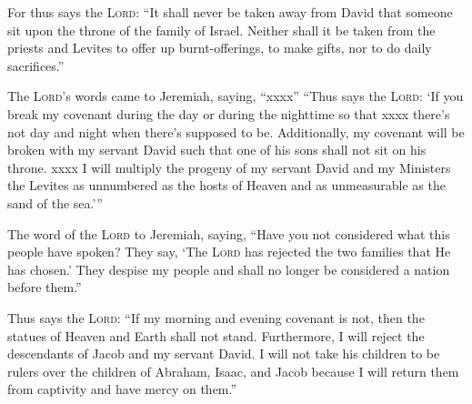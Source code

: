 \begin{inparaenum}
   For thus says the \textsc{Lord}: ``It shall never be taken away from David that someone sit upon the throne of the family of Israel.%
   Neither shall it be taken from the priests and Levites to offer up burnt-offerings, to make gifts, nor to do daily sacrifices.''%
  
   The \textsc{Lord}'s words came to Jeremiah, saying, ``xxxx''%
   ``Thus says the \textsc{Lord}: `If you break my covenant during the day or during the nighttime so that xxxx there's not day and night when there's supposed to be.%
   Additionally, my covenant will be broken with my servant David such that one of his sons shall not sit on his throne. xxxx%
   I will multiply the progeny of my servant David and my Ministers the Levites as unnumbered as the hosts of Heaven and as unmeasurable as the sand of the sea.'\thinspace''%
  
   The word of the \textsc{Lord} to Jeremiah, saying,%
   ``Have you not considered what this people have spoken? They say, `The \textsc{Lord} has rejected the two families that He has chosen.' They despise my people and shall no longer be considered a nation before them.''%
  
   Thus says the \textsc{Lord}: ``If my morning and evening covenant is not, then the statues of Heaven and Earth shall not stand.%
   Furthermore, I will reject the descendants of Jacob and my servant David. I will not take his children to be rulers over the children of Abraham, Isaac, and Jacob because I will return them from captivity and have mercy on them.''%
\end{inparaenum}
